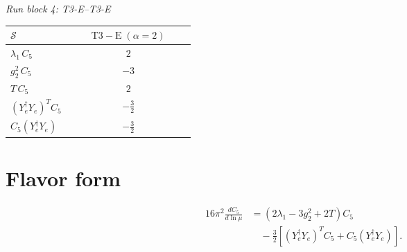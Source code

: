 \documentclass[9pt]{article}
\begin{document}
\textit{Run block 4: T3-E--T3-E}
\begin{longtable}{@{}p{0.31\linewidth}c@{}}
\toprule
$\mathcal{S}$ & $ \mathrm{T3-E}\;(\alpha=2) $ \\
\midrule
$ \lambda_1\,C_5 $ & $ 2 $ \\
$ g_2^2\,C_5 $ & $ -3 $ \\
$ T\,C_5 $ & $ 2 $ \\
$ (Y_e^\dagger Y_e)^T C_5 $ & $ - \frac{3}{2} $ \\
$ C_5(Y_e^\dagger Y_e) $ & $ - \frac{3}{2} $ \\
\bottomrule
\end{longtable}
\section*{Flavor form}
\begin{align}
16\pi^2\frac{dC_5}{d\ln\mu}&=(2\lambda_1-3g_2^2+2T)C_5\\
&\quad-\frac32\left[(Y_e^\dagger Y_e)^T C_5+C_5(Y_e^\dagger Y_e)\right].
\end{align}
\end{document}
